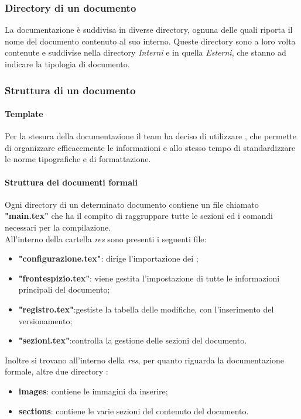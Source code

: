 \subsubsection{Directory di un documento}
La documentazione è suddivisa in diverse directory, ognuna delle quali riporta il nome del documento contenuto al suo interno. Queste directory sono a loro volta contenute e suddivise nella directory \textit{Interni} e in quella \textit{Esterni}, che stanno ad indicare la tipologia di documento.

\subsubsection{Struttura di un documento}
\paragraph{Template}
Per la stesura della documentazione il team ha deciso di utilizzare , che permette di organizzare efficacemente le informazioni e allo stesso tempo di standardizzare le norme tipografiche e di formattazione.

\paragraph{Struttura dei documenti formali}
Ogni directory di un determinato documento contiene un file chiamato \textbf{"main.tex"} che ha il compito di raggruppare tutte le sezioni ed i comandi necessari per la compilazione.\\
All'interno della cartella \textit{res} sono presenti i seguenti file:
\begin{itemize}
	\item \textbf{"configurazione.tex"}: dirige l'importazione dei ;
	\item \textbf{"frontespizio.tex"}: viene gestita l'impostazione di tutte le informazioni principali del documento;
	\item \textbf{"registro.tex"}:gestiste la tabella delle modifiche, con l'inserimento del versionamento;
	\item \textbf{"sezioni.tex"}:controlla la gestione delle sezioni del documento.
\end{itemize}
Inoltre si trovano all'interno della \textit{res}, per quanto riguarda la documentazione formale, altre due directory :
\begin{itemize}
	\item \textbf{images}: contiene le immagini da inserire;
	\item\textbf{sections}: contiene le varie sezioni del contenuto del documento.
\end{itemize}

